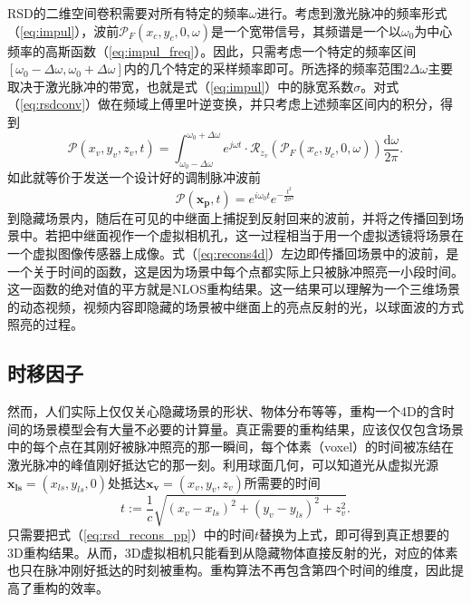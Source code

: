 \documentclass[master]{shtthesis}             %
\begin{document}
RSD的二维空间卷积需要对所有特定的频率$\omega$进行。考虑到激光脉冲的频率形式（\ref{eq:impul}），波前$\mathcal{P}_F(x_c,y_c,0,\omega)$是一个宽带信号，其频谱是一个以$\omega_0$为中心频率的高斯函数（\ref{eq:impul_freq}）。因此，只需考虑一个特定的频率区间$[\omega_0-\Delta \omega, \omega_0+\Delta \omega]$内的几个特定的采样频率即可。所选择的频率范围$2\Delta\omega$主要取决于激光脉冲的带宽，也就是式（\ref{eq:impul}）中的脉宽系数$\sigma$。对式（\ref{eq:rsdconv}）做在频域上傅里叶逆变换，并只考虑上述频率区间内的积分，得到
\begin{equation}\label{eq:recons4d}
  \mathcal{P}(x_v,y_v,z_v,t)=\int_{\omega_0-\Delta \omega}^{\omega_0+\Delta \omega} e^{j\omega t}\cdot \mathcal{R}_{z_v}\left( \mathcal{P}_F(x_c,y_c,0,\omega) \right) \frac{\text{d}\omega}{2\pi} .
\end{equation}
如此就等价于发送一个设计好的调制脉冲波前
\begin{equation}
  \mathcal{P}(\mathbf{x_p},t)=e^{i\omega_0 t}e^{-\frac{t^2}{2\sigma^2}}
\end{equation} 
到隐藏场景内，随后在可见的中继面上捕捉到反射回来的波前，并将之传播回到场景中。若把中继面视作一个虚拟相机孔，这一过程相当于用一个虚拟透镜将场景在一个虚拟图像传感器上成像。式（\ref{eq:recons4d}）左边即传播回场景中的波前，是一个关于时间的函数，这是因为场景中每个点都实际上只被脉冲照亮一小段时间。这一函数的绝对值的平方就是NLOS重构结果。这一结果可以理解为一个三维场景的动态视频，视频内容即隐藏的场景被中继面上的亮点反射的光，以球面波的方式照亮的过程。

\subsection{时移因子}\label{sec:timeshift_factor}

然而，人们实际上仅仅关心隐藏场景的形状、物体分布等等，重构一个4D的含时间的场景模型会有大量不必要的计算量。真正需要的重构结果，应该仅仅包含场景中的每个点在其刚好被脉冲照亮的那一瞬间，每个体素（voxel）的时间被冻结在激光脉冲的峰值刚好抵达它的那一刻。利用球面几何，可以知道光从虚拟光源$\mathbf{x_{ls}}=(x_{ls},y_{ls},0)$处抵达$\mathbf{x_v}=(x_v,y_v,z_v)$所需要的时间
\begin{equation}\label{eq:trav_time}
  t := \frac{1}{c}\sqrt{(x_v-x_{ls})^2+(y_v-y_{ls})^2+z_v^2}.
\end{equation}  
只需要把式（\ref{eq:rsd_recons_pp}）中的时间$t$替换为上式，即可得到真正想要的3D重构结果。从而，3D虚拟相机只能看到从隐藏物体直接反射的光，对应的体素也只在脉冲刚好抵达的时刻被重构。重构算法不再包含第四个时间的维度，因此提高了重构的效率。
\end{document}
